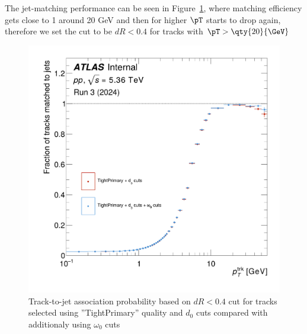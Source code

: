 The jet-matching performance can be seen in Figure~\ref{fig:jetmatched_fractions}, where matching efficiency gets close to 1 around 20 GeV and then for higher $\pT$ starts to drop again, therefore we set the cut to be $dR<0.4$ for tracks with $\pT > \qty{20}{\GeV}$
\begin{figure}[h!]
    \centering
    \includegraphics[width=0.55\linewidth]{images/trk_jetmatch0_.png}
    \caption{Track-to-jet association probability based on $dR<0.4$ cut for tracks selected using ''TightPrimary'' quality and $d_0$ cuts compared with additionaly using $\omega_0$ cuts}
    \label{fig:jetmatched_fractions}
\end{figure}

